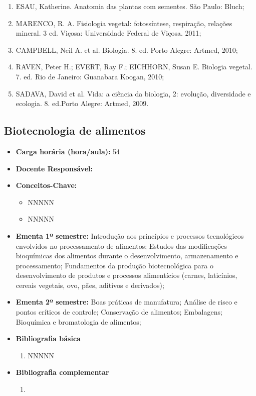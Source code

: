\documentclass[11pt,fleqn]{book} %
\begin{document}
\begin{itemize}
	\begin{enumerate}
		\item ESAU, Katherine. Anatomia das plantas com sementes. São Paulo: Bluch;
		\item MARENCO, R. A. Fisiologia vegetal: fotossíntese, respiração, relações mineral. 3 ed. Viçosa: Universidade Federal de Viçosa. 2011;
		\item CAMPBELL, Neil A. et al. Biologia. 8. ed. Porto Alegre: Artmed, 2010;
		\item RAVEN, Peter H.; EVERT, Ray F.; EICHHORN, Susan E. Biologia vegetal. 7. ed. Rio de Janeiro: Guanabara Koogan, 2010;
		\item SADAVA, David et al. Vida: a ciência da biologia, 2: evolução, diversidade e ecologia. 8. ed.Porto Alegre: Artmed, 2009.
	\end{enumerate}	
\end{itemize}

\newpage
\subsection{Biotecnologia de alimentos}\label{disc:biotecAlimentos}
\begin{itemize}
	\item \textbf{Carga horária (hora/aula):} 54
	\item \textbf{Docente Responsável:}
	\item \textbf{Conceitos-Chave:}
	\begin{itemize}
		\item NNNNN
		\item NNNNN
	\end{itemize}
	\item \textbf{Ementa 1º semestre:}	
	Introdução aos princípios e processos tecnológicos envolvidos no processamento de alimentos;
	Estudos das modificações bioquímicas dos alimentos durante o desenvolvimento, armazenamento e processamento;
	Fundamentos da produção biotecnológica para o desenvolvimento de produtos e processos alimentícios (carnes, laticínios, cereais vegetais, ovo, pães, aditivos e derivados);
	\item \textbf{Ementa 2º semestre:}	
	Boas práticas de manufatura;
	Análise de risco e pontos críticos de controle;
	Conservação de alimentos;
	Embalagens;
	Bioquímica e bromatologia de alimentos;
	\item \textbf{Bibliografia básica}
	\begin{enumerate}
		\item NNNNN
	\end{enumerate}
	\item \textbf{Bibliografia complementar}
	\begin{enumerate}
		\item 
	\end{enumerate}	
\end{itemize}
\end{document}
